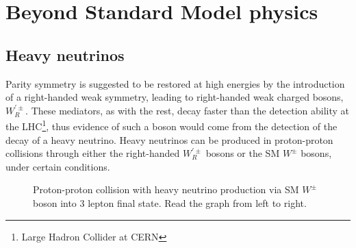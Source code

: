\section{Beyond Standard Model physics}

\subsection*{Heavy neutrinos}
Parity symmetry is suggested to be restored at high energies by the introduction of 
a right-handed weak symmetry, leading to right-handed weak charged bosons, $W_R^{'\pm}$. 
These mediators, as with the rest, decay faster than the detection ability at the LHC\footnote{Large Hadron Collider at CERN}, thus 
evidence of such a boson would come from the detection of the decay of a heavy neutrino. Heavy neutrinos can 
be produced in proton-proton collisions through either the right-handed $W_R^{'\pm}$ bosons or
the SM $W^{\pm}$ bosons, under certain conditions.


\begin{figure}[H]
    \centering
    \caption[Heavy neutrino signal diagram, SM W]{Proton-proton collision with heavy neutrino production via SM $W^{\pm}$ boson into 3 lepton final state. Read the graph from left to right.}
    \label{fig:Target_model_1}
    
\end{figure}



